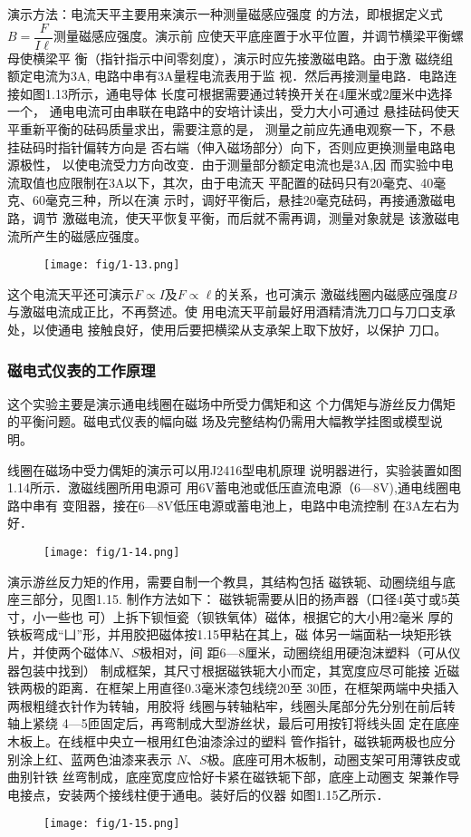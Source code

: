 演示方法：电流天平主要用来演示一种测量磁感应强度
的方法，即根据定义式$B=\dfrac{F}{I\ell}$测量磁感应强度。演示前
应使天平底座置于水平位置，并调节横梁平衡螺母使横梁平
衡（指针指示中间零刻度），演示时应先接激磁电路。由于激
磁绕组额定电流为3A, 电路中串有3A量程电流表用于监
视．然后再接测量电路．电路连接如图1.13所示，通电导体
长度可根据需要通过转换开关在4厘米或2厘米中选择一个，
通电电流可由串联在电路中的安培计读出，受力大小可通过
悬挂砝码使天平重新平衡的砝码质量求出，需要注意的是，
测量之前应先通电观察一下，不悬挂砝码时指针偏转方向是
否右端（伸入磁场部分）向下，否则应更换测量电路电源极性，
以使电流受力方向改变．由于测量部分额定电流也是3A,因
而实验中电流取值也应限制在3A以下，其次，由于电流天
平配置的砝码只有20毫克、40毫克、60毫克三种，所以在演
示时，调好平衡后，悬挂20毫克砝码，再接通激磁电路，调节
激磁电流，使天平恢复平衡，而后就不需再调，测量对象就是
该激磁电流所产生的磁感应强度。
\begin{figure}[htp]
    \centering
\texttt{[image: fig/1-13.png]}
    \caption{}
\end{figure}

这个电流天平还可演示$F\propto I$及$F\propto\ell$的关系，也可演示
激磁线圈内磁感应强度$B$与激磁电流成正比，不再赘述。使
用电流天平前最好用酒精清洗刀口与刀口支承处，以使通电
接触良好，使用后要把横梁从支承架上取下放好，以保护
刀口。

\subsubsection{磁电式仪表的工作原理}
这个实验主要是演示通电线圈在磁场中所受力偶矩和这
个力偶矩与游丝反力偶矩的平衡问题。磁电式仪表的幅向磁
场及完整结构仍需用大幅教学挂图或模型说明。

线圈在磁场中受力偶矩的演示可以用J2416型电机原理
说明器进行，实验装置如图1.14所示．激磁线圈所用电源可
用6V蓄电池或低压直流电源（6—8V),通电线圈电路中串有
变阻器，接在6—8V低压电源或蓄电池上，电路中电流控制
在3A左右为好．
\begin{figure}[htp]
    \centering
\texttt{[image: fig/1-14.png]}
    \caption{}
\end{figure}

演示游丝反力矩的作用，需要自制一个教具，其结构包括
磁铁轭、动圈绕组与底座三部分，见图1.15. 制作方法如下：
磁铁轭需要从旧的扬声器（口径4英寸或5英寸，小一些也
可）上拆下钡恒瓷（钡铁氧体）磁体，根据它的大小用2毫米
厚的铁板弯成“凵”形，并用胶把磁体按1.15甲粘在其上，磁
体另一端面粘一块矩形铁片，并使两个磁体$N$、$S$极相对，间
距6—8厘米，动圈绕组用硬泡沫塑料（可从仪器包装中找到）
制成框架，其尺寸根据磁铁轭大小而定，其宽度应尽可能接
近磁铁两极的距离．在框架上用直径0.3毫米漆包线绕20至
30匝，在框架两端中央插入两根粗缝衣针作为转轴，用胶将
线圈与转轴粘牢，线圈头尾部分先分别在前后转轴上紧绕
4—5匝固定后，再弯制成大型游丝状，最后可用按钉将线头固
定在底座木板上。在线框中央立一根用红色油漆涂过的塑料
管作指针，磁铁轭两极也应分别涂上红、蓝两色油漆来表示
$N$、$S$极。底座可用木板制，动圈支架可用薄铁皮或曲别针铁
丝弯制成，底座宽度应恰好卡紧在磁铁轭下部，底座上动圈支
架兼作导电接点，安装两个接线柱便于通电。装好后的仪器
如图1.15乙所示．
\begin{figure}[htp]
    \centering
\texttt{[image: fig/1-15.png]}
    \caption{}
\end{figure}

